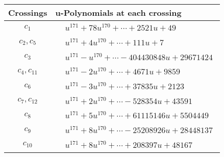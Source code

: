 \documentclass[1p]{elsarticle_modified}
\theoremstyle{definition}
\begin{document}
\begin{tabular}{m{50pt}|m{274pt}}
Crossings & \hspace{64pt}u-Polynomials at each crossing \\
\hline $$\begin{aligned}c_{1}\end{aligned}$$&$\begin{aligned}
&u^{171}+78 u^{170}+\cdots+2521 u+49
\end{aligned}$\\
\hline $$\begin{aligned}c_{2},c_{5}\end{aligned}$$&$\begin{aligned}
&u^{171}+4 u^{170}+\cdots+111 u+7
\end{aligned}$\\
\hline $$\begin{aligned}c_{3}\end{aligned}$$&$\begin{aligned}
&u^{171}- u^{170}+\cdots-404430848 u+29671424
\end{aligned}$\\
\hline $$\begin{aligned}c_{4},c_{11}\end{aligned}$$&$\begin{aligned}
&u^{171}-2 u^{170}+\cdots+4671 u+9859
\end{aligned}$\\
\hline $$\begin{aligned}c_{6}\end{aligned}$$&$\begin{aligned}
&u^{171}-3 u^{170}+\cdots+37835 u+2123
\end{aligned}$\\
\hline $$\begin{aligned}c_{7},c_{12}\end{aligned}$$&$\begin{aligned}
&u^{171}+2 u^{170}+\cdots-528354 u+43591
\end{aligned}$\\
\hline $$\begin{aligned}c_{8}\end{aligned}$$&$\begin{aligned}
&u^{171}+5 u^{170}+\cdots+61115146 u+5504449
\end{aligned}$\\
\hline $$\begin{aligned}c_{9}\end{aligned}$$&$\begin{aligned}
&u^{171}+8 u^{170}+\cdots-25208926 u+28448137
\end{aligned}$\\
\hline $$\begin{aligned}c_{10}\end{aligned}$$&$\begin{aligned}
&u^{171}+8 u^{170}+\cdots+208397 u+48167
\end{aligned}$\\
\hline
\end{tabular}\\~\\
\end{document}
